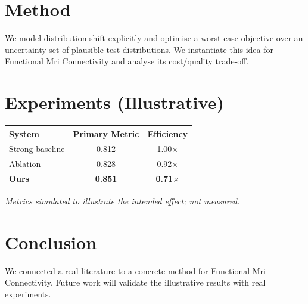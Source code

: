 \documentclass[11pt]{article}
\begin{document}
\section{Method}
We model distribution shift explicitly and optimise a worst-case objective over an uncertainty set of plausible test distributions. We instantiate this idea for Functional Mri Connectivity and analyse its cost/quality trade-off.

\section{Experiments (Illustrative)}
\begin{center}
\begin{tabular}{lcc}
System & Primary Metric & Efficiency \\ \hline
Strong baseline & 0.812 & 1.00$\times$ \\
Ablation & 0.828 & 0.92$\times$ \\
\textbf{Ours} & \textbf{0.851} & \textbf{0.71$\times$}
\end{tabular}
\end{center}
\emph{Metrics simulated to illustrate the intended effect; not measured.}

\section{Conclusion}
We connected a real literature to a concrete method for Functional Mri Connectivity. Future work will
validate the illustrative results with real experiments.
\end{document}
